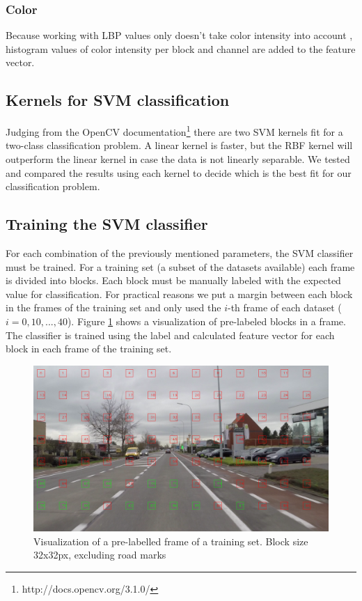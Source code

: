 \documentclass[runningheads,a4paper]{llncs}
\begin{document}
\subsubsection{Color}
Because working with LBP values only doesn't take color intensity into account \cite{Pietikainen2002}, histogram values of color intensity per block and channel are added to the feature vector. 

\subsection{Kernels for SVM classification}\label{methods-kernels}
Judging from the OpenCV documentation\footnote{http://docs.opencv.org/3.1.0/} there are two SVM kernels fit for a two-class classification problem.
A linear kernel is faster, but the RBF kernel will outperform the linear kernel in case the data is not linearly separable. We tested and compared the results using each kernel to decide which is the best fit for our classification problem.

\subsection{Training the SVM classifier}
For each combination of the previously mentioned parameters, the SVM classifier must be trained. For a training set (a subset of the datasets available) each frame is divided into blocks. Each block must be manually labeled with the expected value for classification. For practical reasons we put a margin between each block in the frames of the training set and only used the $i$-th frame of each dataset ($i=0,10,...,40$).
Figure \ref{fig:frame-training} shows a visualization of pre-labeled blocks in a frame.
The classifier is trained using the label and calculated feature vector for each block in each frame of the training set.

\begin{figure}[ht]
\centering
  \centering
  \includegraphics[width=.7\textwidth]{fig/svm_training_32.png}
\caption{Visualization of a pre-labelled frame of a training set. Block size 32x32px, excluding road marks}
\label{fig:frame-training}
\end{figure}
\end{document}
